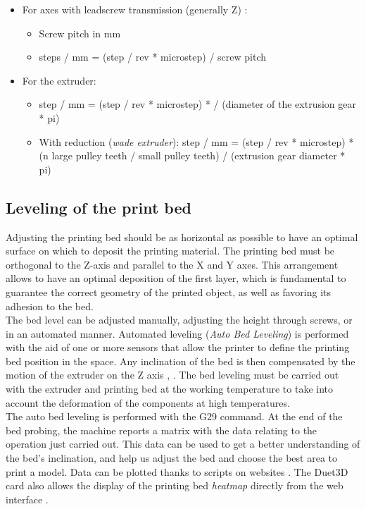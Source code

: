 \begin{itemize}
\item For axes with leadscrew transmission (generally Z) \parencite{Reference51}:

\begin{itemize}
\item Screw pitch in mm
\item steps / mm = (step / rev * microstep) / screw pitch
\end{itemize}

\item For the extruder:

\begin {itemize}
\item step / mm = (step / rev * microstep) * / (diameter of the extrusion gear * pi)
\item With reduction (\emph{wade extruder}): step / mm = (step / rev * microstep) * (n large pulley teeth / small pulley teeth) / (extrusion gear diameter * pi)
\end{itemize}

\end{itemize}

\subsection{Leveling of the print bed}
Adjusting the printing bed should be as horizontal as possible to have an optimal surface on which to deposit the printing material. The printing bed must be orthogonal to the Z-axis and parallel to the X and Y axes. This arrangement allows to have an optimal deposition of the first layer, which is fundamental to guarantee the correct geometry of the printed object, as well as favoring its adhesion to the bed. \\
The bed level can be adjusted manually, adjusting the height through screws, or in an automated manner. Automated leveling (\emph{Auto Bed Leveling}) is performed with the aid of one or more sensors that allow the printer to define the printing bed position in the space. Any inclination of the bed is then compensated by the motion of the extruder on the Z axis \parencite{Reference7}, \parencite{Reference8}. The bed leveling must be carried out with the extruder and printing bed at the working temperature to take into account the deformation of the components at high temperatures. \\
The auto bed leveling is performed with the G29 command. At the end of the bed probing, the machine reports a matrix with the data relating to the operation just carried out. This data can be used to get a better understanding of the bed's inclination, and help us adjust the bed and choose the best area to print a model.
Data can be plotted thanks to scripts on websites \parencite{Reference9}. The Duet3D card also allows the display of the printing bed \emph{heatmap} directly from the web interface \parencite{Reference10}.

